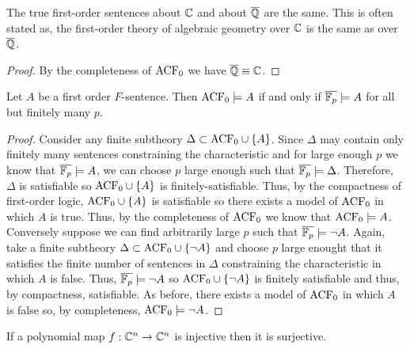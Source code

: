 \documentclass[12pt]{article}
\begin{document}
\begin{theorem}
The true first-order sentences about $\mathbb{C}$ and about $\overline{\mathbb{Q}}$ are the same. This is often stated as, the first-order theory of algebraic geometry over $\mathbb{C}$ is the same as over $\overline{\mathbb{Q}}$.
\end{theorem}

\begin{proof}
By the completeness of $\mathrm{ACF}_{0}$ we have $\overline{\mathbb{Q}} \equiv \mathbb{C}$. 
\end{proof}

\begin{theorem}
Let $A$ be a first order $F$-sentence. Then $\mathrm{ACF}_{0} \models A$ if and only if $\overline{\mathbb{F}_{p}} \models A$ for all but finitely many $p$.   
\end{theorem}

\begin{proof}
Consider any finite subtheory $\Delta \subset \mathrm{ACF}_{0} \cup \{A\}$. Since $\Delta$ may contain only finitely many sentences constraining the characteristic and for large enough $p$ we know that $\overline{\mathbb{F}_{p}} \models A$, we can choose $p$ large enough such that $\overline{\mathbb{F}_{p}}  \models \Delta$. Therefore, $\Delta$ is satisfiable so $\mathrm{ACF}_{0} \cup \{A\}$ is finitely-satisfiable. Thus, by the compactness of first-order logic, $\mathrm{ACF}_{0} \cup \{A\}$ is satisfiable so there exists a model of $\mathrm{ACF}_{0}$ in which $A$ is true. Thus, by the completeness of $\mathrm{ACF}_{0}$ we know that $\mathrm{ACF}_{0} \models A$.   
\bigskip\\
Conversely suppose we can find arbitrarily large $p$ such that $\overline{\mathbb{F}_{p}} \models \neg A$. Again, take a finite subtheory $\Delta \subset \mathrm{ACF}_{0} \cup \{\neg A\}$ and choose $p$ large enought that it satisfies the finite number of sentences in $\Delta$ constraining the characteristic in which $A$ is false. Thus, $\overline{\mathbb{F}_{p}} \models \neg A$ so $\mathrm{ACF}_{0} \cup \{\neg A\}$ is finitely satisfiable and thus, by compactness, satisfiable. As before, there exists a model of $\mathrm{ACF}_{0}$ in which $A$ is false so, by completeness, $\mathrm{ACF}_{0} \models \neg A$. 
\end{proof}

\begin{theorem}[Ax-Grothendiek]
If a polynomial map $f : \mathbb{C}^n \to \mathbb{C}^n$ is injective then it is surjective.
\end{theorem}
\end{document}
